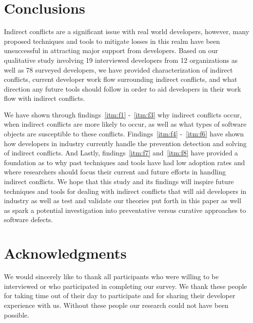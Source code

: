 \documentclass[conference]{IEEEtran}
\begin{document}
\section{Conclusions}
\label{sec:conc}

Indirect conflicts are a significant issue with real world developers, however, many proposed techniques and tools to mitigate
losses in this realm have been unsuccessful in attracting major support from developers. Based on our qualitative study involving
19 interviewed developers from 12 organizations as well as 78 surveyed developers, we have provided characterization of indirect conflicts,
current developer work flow surrounding indirect conflicts, and what direction any future tools should follow in order to aid developers
in their work flow with indirect conflicts.

We have shown through findings~\ref{itm:f1} -~\ref{itm:f3} why indirect conflicts occur, when indirect conflicts are more likely to
occur, as well as what types of software objects are susceptible to these conflicts. Findings~\ref{itm:f4} -~\ref{itm:f6} have shown
how developers in industry currently handle the prevention detection and solving of indirect conflicts. And Lastly, findings~\ref{itm:f7} 
and~\ref{itm:f8} have provided a foundation as to why past techniques and tools have had low adoption rates and where
researchers should focus their current and future efforts in handling indirect conflicts. We hope that this study and its 
findings will inspire future techniques and tools for dealing with indirect conflicts that 
will aid developers in industry as well as test and validate our theories put forth in this paper as well as spark a potential
investigation into preventative versus curative approaches to software defects.

\section{Acknowledgments}

We would sincerely like to thank all participants who were willing to be interviewed or who participated
in completing our survey. We thank these people for taking time out of their day to participate and for
sharing their developer experience with us. Without these people our research could not have been possible.




\end{document}
